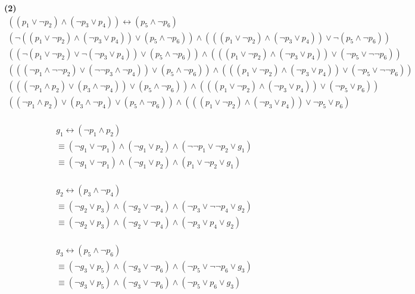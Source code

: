 \documentclass[11pt]{article}
\renewcommand{\part}[1] {\vspace{.10in} {\bf (#1)}}
\begin{document}
\part{2}
\begin{eqnarray*}
((p_1 \vee \neg p_2) \wedge (\neg p_3 \vee p_4)) \leftrightarrow (p_5 \wedge \neg p_6)\\
(\neg ((p_1 \vee \neg p_2) \wedge (\neg p_3 \vee p_4)) \vee (p_5 \wedge \neg p_6)) \wedge (((p_1 \vee \neg p_2) \wedge (\neg p_3 \vee p_4)) \vee \neg (p_5 \wedge \neg p_6))\\
((\neg (p_1 \vee \neg p_2) \vee \neg (\neg p_3 \vee p_4)) \vee (p_5 \wedge \neg p_6)) \wedge (((p_1 \vee \neg p_2) \wedge (\neg p_3 \vee p_4)) \vee (\neg p_5 \vee \neg \neg p_6))\\
(((\neg p_1 \wedge\neg \neg p_2) \vee (\neg \neg p_3 \wedge \neg p_4)) \vee (p_5 \wedge \neg p_6)) \wedge (((p_1 \vee \neg p_2) \wedge (\neg p_3 \vee p_4)) \vee (\neg p_5 \vee \neg \neg p_6))\\
(((\neg p_1 \wedge p_2) \vee (p_3 \wedge \neg p_4)) \vee (p_5 \wedge \neg p_6)) \wedge (((p_1 \vee \neg p_2) \wedge (\neg p_3 \vee p_4)) \vee (\neg p_5 \vee p_6))\\
((\neg p_1 \wedge p_2) \vee (p_3 \wedge \neg p_4) \vee (p_5 \wedge \neg p_6)) \wedge (((p_1 \vee \neg p_2) \wedge (\neg p_3 \vee p_4)) \vee \neg p_5 \vee p_6)\\
\end{eqnarray*}

\begin{eqnarray*}
g_1 \leftrightarrow (\neg p_1 \wedge p_2)\\
\equiv (\neg g_1 \vee \neg p_1) \wedge (\neg g_1 \vee p_2) \wedge (\neg \neg p_1 \vee \neg p_2 \vee g_1)\\
\equiv (\neg g_1 \vee \neg p_1) \wedge (\neg g_1 \vee p_2) \wedge (p_1 \vee \neg p_2 \vee g_1)\\
\end{eqnarray*}

\begin{eqnarray*}
g_2 \leftrightarrow (p_3 \wedge \neg p_4)\\
\equiv (\neg g_2 \vee p_3) \wedge (\neg g_2 \vee \neg p_4) \wedge (\neg p_3 \vee \neg \neg p_4 \vee g_2)\\
\equiv (\neg g_2 \vee p_3) \wedge (\neg g_2 \vee \neg p_4) \wedge (\neg p_3 \vee p_4 \vee g_2)\\
\end{eqnarray*}

\begin{eqnarray*}
g_3 \leftrightarrow (p_5 \wedge \neg p_6)\\
\equiv (\neg g_3 \vee p_5) \wedge (\neg g_3 \vee \neg p_6) \wedge (\neg p_5 \vee \neg \neg p_6 \vee g_3)\\
\equiv (\neg g_3 \vee p_5) \wedge (\neg g_3 \vee \neg p_6) \wedge (\neg p_5 \vee p_6 \vee g_3)\\
\end{eqnarray*}
\end{document}
